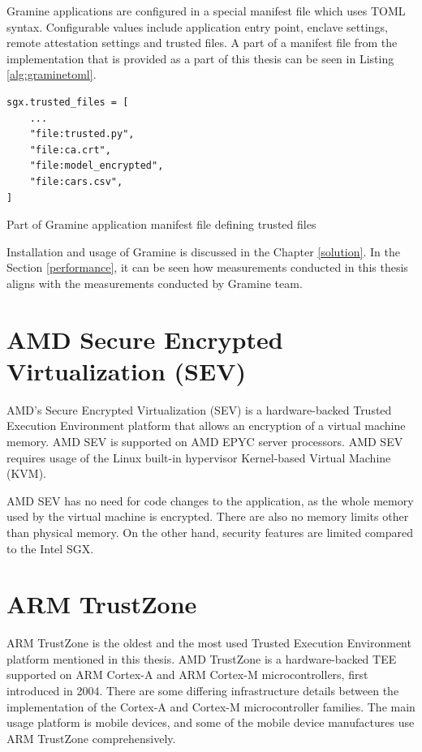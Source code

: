 Gramine applications are configured in a special manifest file which uses TOML syntax. Configurable values include application entry point, enclave settings, remote attestation settings and trusted files. A part of a manifest file from the implementation that is provided as a part of this thesis can be seen in Listing \ref{alg:graminetoml}.

\begin{algorithm}
\begin{verbatim}
sgx.trusted_files = [
    ...
    "file:trusted.py",
    "file:ca.crt",
    "file:model_encrypted",
    "file:cars.csv",
]
\end{verbatim}
\caption{Part of Gramine application manifest file defining trusted files\label{alg:graminetoml}}
\end{algorithm}

Installation and usage of Gramine is discussed in the Chapter \ref{solution}. In the Section \ref{performance}, it can be seen how measurements conducted in this thesis aligns with the measurements conducted by Gramine team.

\section{AMD Secure Encrypted Virtualization (SEV)} \label{sev}

AMD's Secure Encrypted Virtualization (SEV) is a hardware-backed Trusted Execution Environment platform that allows an encryption of a virtual machine memory. AMD SEV is supported on AMD EPYC server processors. AMD SEV requires usage of the Linux built-in hypervisor Kernel-based Virtual Machine (KVM).

AMD SEV has no need for code changes to the application, as the whole memory used by the virtual machine is encrypted. There are also no memory limits other than physical memory. On the other hand, security features are limited compared to the Intel SGX.\cite{suse}

\section{ARM TrustZone} \label{trustzone}

ARM TrustZone is the oldest and the most used Trusted Execution Environment platform mentioned in this thesis. AMD TrustZone is a hardware-backed TEE supported on ARM Cortex-A and ARM Cortex-M microcontrollers, first introduced in 2004. There are some differing infrastructure details between the implementation of the Cortex-A and Cortex-M microcontroller families. The main usage platform is mobile devices, and some of the mobile device manufactures use ARM TrustZone comprehensively.\cite{trustzone}

